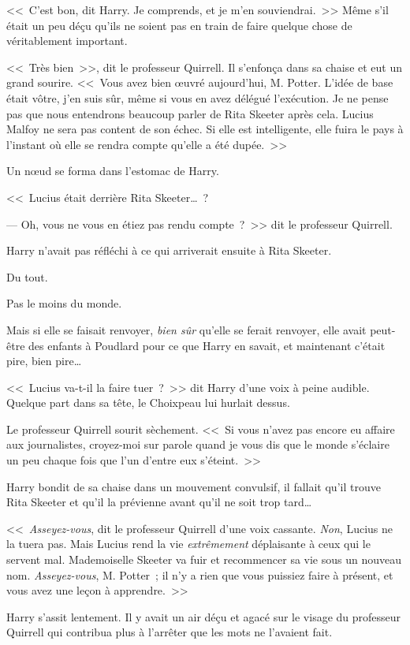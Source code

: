 <<~C'est bon, dit Harry. Je comprends, et je m'en souviendrai.~>> Même s'il était un peu déçu qu'ils ne soient pas en train de faire quelque chose de véritablement important.

<<~Très bien~>>, dit le professeur Quirrell. Il s'enfonça dans sa chaise et eut un grand sourire. <<~Vous avez bien œuvré aujourd'hui, M. Potter. L'idée de base était vôtre, j'en suis sûr, même si vous en avez délégué l'exécution. Je ne pense pas que nous entendrons beaucoup parler de Rita Skeeter après cela. Lucius Malfoy ne sera pas content de son échec. Si elle est intelligente, elle fuira le pays à l'instant où elle se rendra compte qu'elle a été dupée.~>>

Un nœud se forma dans l'estomac de Harry.

<<~Lucius était derrière Rita Skeeter…~?

--- Oh, vous ne vous en étiez pas rendu compte~?~>> dit le professeur Quirrell.

Harry n'avait pas réfléchi à ce qui arriverait ensuite à Rita Skeeter.

Du tout.

Pas le moins du monde.

Mais si elle se faisait renvoyer, \emph{bien sûr} qu'elle se ferait renvoyer, elle avait peut-être des enfants à Poudlard pour ce que Harry en savait, et maintenant c'était pire, bien pire…

<<~Lucius va-t-il la faire tuer~?~>> dit Harry d'une voix à peine audible. Quelque part dans sa tête, le Choixpeau lui hurlait dessus.

Le professeur Quirrell sourit sèchement. <<~Si vous n'avez pas encore eu affaire aux journalistes, croyez-moi sur parole quand je vous dis que le monde s'éclaire un peu chaque fois que l'un d'entre eux s'éteint.~>>

Harry bondit de sa chaise dans un mouvement convulsif, il fallait qu'il trouve Rita Skeeter et qu'il la prévienne avant qu'il ne soit trop tard…

<<~\emph{Asseyez-vous}, dit le professeur Quirrell d'une voix cassante. \emph{Non}, Lucius ne la tuera pas. Mais Lucius rend la vie \emph{extrêmement} déplaisante à ceux qui le servent mal. Mademoiselle Skeeter va fuir et recommencer sa vie sous un nouveau nom. \emph{Asseyez-vous}, M. Potter~; il n'y a rien que vous puissiez faire à présent, et vous avez une leçon à apprendre.~>>

Harry s'assit lentement. Il y avait un air déçu et agacé sur le visage du professeur Quirrell qui contribua plus à l'arrêter que les mots ne l'avaient fait.

